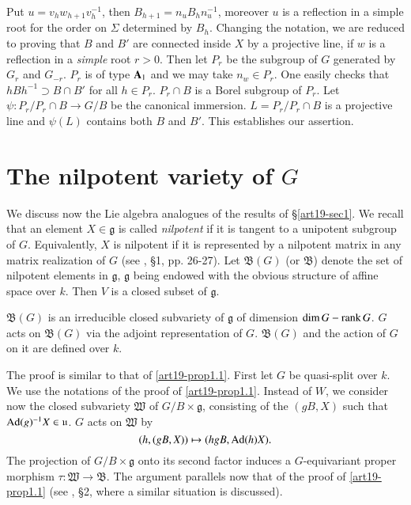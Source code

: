 Put $u=v_{h}w_{h+1}v^{-1}_{h}$, then $B_{h+1}=n_{u}B_{h}n^{-1}_{u}$, moreover $u$ is a reflection in a simple root for the order on $\Sigma$ determined by $B_{h}$. Changing the notation, we are reduced to proving that $B$ and $B'$ are connected inside $X$ by a projective line, if $w$ is a reflection in a {\em simple} root $r>0$. Then let $P_{r}$ be the subgroup of $G$ generated by $G_{r}$ and $G_{-r}$. $P_{r}$ is of type $\mathbf{A}_{1}$ and we may take $n_{w}\in P_{r}$. One easily checks that $hBh^{-1}\supset B\cap B'$ for all $h\in P_{r}$. $P_{r}\cap B$ is a Borel subgroup of $P_{r}$. Let $\psi:P_{r}/P_{r}\cap B\to G/B$ be the canonical immersion. $L=P_{r}/P_{r}\cap B$ is a projective line and $\psi(L)$ contains both $B$ and $B'$. This establishes our assertion.

\section{The nilpotent variety of $G$}\label{art19-sec2}

We discuss now the Lie algebra analogues of the results of \S\ref{art19-sec1}. We recall that an element $X\in \mathfrak{g}$ is called {\em nilpotent} if it is tangent to a unipotent subgroup of $G$. Equivalently, $X$ is nilpotent if it is represented by a nilpotent matrix in any matrix realization of $G$ (see \cite{art19-key1}, \S1, pp. 26-27). Let $\mathfrak{B}(G)$ (or $\mathfrak{B}$) denote the set of nilpotent elements in $\mathfrak{g}$, $\mathfrak{g}$ being endowed with the obvious structure of affine space over $k$. Then $V$ is a closed subset of $\mathfrak{g}$.

\begin{proposition}\label{art19-prop2.1}
$\mathfrak{B}(G)$ is an irreducible closed subvariety of $\mathfrak{g}$ of dimension $\dim G -\operatorname{\mathrm{rank}} G$. $G$ acts on $\mathfrak{B}(G)$ via the adjoint representation of $G$. $\mathfrak{B}(G)$ and the action of $G$ on it are defined over $k$.
\end{proposition}

The proof is similar to that of \ref{art19-prop1.1}. First let $G$ be quasi-split over $k$. We use the notations of the proof of \ref{art19-prop1.1}. Instead of $W$, we consider now the closed subvariety $\mathfrak{W}$ of $G/B\times \mathfrak{g}$, consisting of the $(gB,X)$ such that $\operatorname{\mathrm{Ad}}(g)^{-1}X\in \mathfrak{u}$. $G$ acts on $\mathfrak{W}$ by
$$
(h,(gB,X))\mapsto (hgB,\operatorname{\mathrm{Ad}}(h)X).
$$
The projection of $G/B\times \mathfrak{g}$ onto its second factor induces a $G$-equivariant proper morphism $\tau : \mathfrak{W}\to \mathfrak{B}$. The argument parallels now that of the proof of \ref{art19-prop1.1} (see \cite{art19-key2}, \S2, where a similar situation is discussed).

